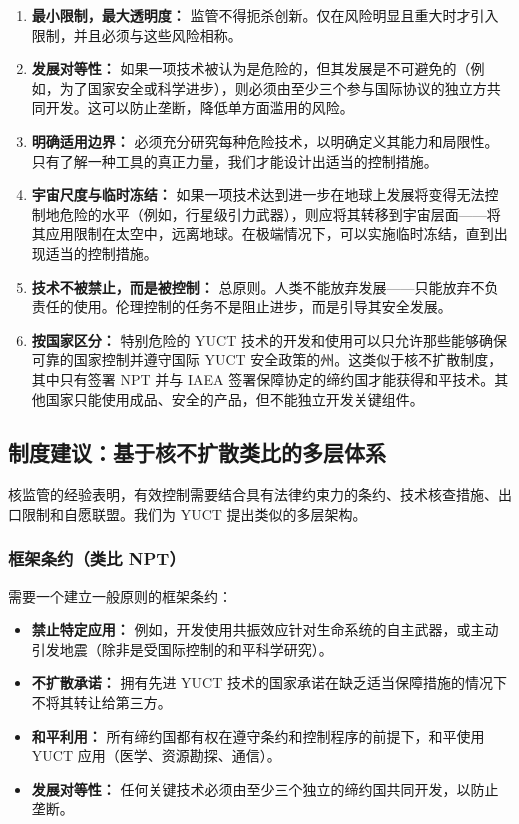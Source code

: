 \documentclass[12pt,a4paper]{article}
\theoremstyle{remark}
\begin{document}
	\begin{enumerate}[leftmargin=*]
		\item \textbf{最小限制，最大透明度：} 监管不得扼杀创新。仅在风险明显且重大时才引入限制，并且必须与这些风险相称。
		
		\item \textbf{发展对等性：} 如果一项技术被认为是危险的，但其发展是不可避免的（例如，为了国家安全或科学进步），则必须由至少三个参与国际协议的独立方共同开发。这可以防止垄断，降低单方面滥用的风险。
		
		\item \textbf{明确适用边界：} 必须充分研究每种危险技术，以明确定义其能力和局限性。只有了解一种工具的真正力量，我们才能设计出适当的控制措施。
		
		\item \textbf{宇宙尺度与临时冻结：} 如果一项技术达到进一步在地球上发展将变得无法控制地危险的水平（例如，行星级引力武器），则应将其转移到宇宙层面——将其应用限制在太空中，远离地球。在极端情况下，可以实施临时冻结，直到出现适当的控制措施。
		
		\item \textbf{技术不被禁止，而是被控制：} 总原则。人类不能放弃发展——只能放弃不负责任的使用。伦理控制的任务不是阻止进步，而是引导其安全发展。
		
		\item \textbf{按国家区分：} 特别危险的 YUCT 技术的开发和使用可以只允许那些能够确保可靠的国家控制并遵守国际 YUCT 安全政策的州。这类似于核不扩散制度，其中只有签署 NPT 并与 IAEA 签署保障协定的缔约国才能获得和平技术。其他国家只能使用成品、安全的产品，但不能独立开发关键组件。
	\end{enumerate}
	
	\subsection{制度建议：基于核不扩散类比的多层体系}
	\label{subsec:institutions}
	
	核监管的经验表明，有效控制需要结合具有法律约束力的条约、技术核查措施、出口限制和自愿联盟。我们为 YUCT 提出类似的多层架构。
	
	\subsubsection{框架条约（类比 NPT）}
	
	需要一个建立一般原则的框架条约：
	\begin{itemize}
		\item \textbf{禁止特定应用：} 例如，开发使用共振效应针对生命系统的自主武器，或主动引发地震（除非是受国际控制的和平科学研究）。
		\item \textbf{不扩散承诺：} 拥有先进 YUCT 技术的国家承诺在缺乏适当保障措施的情况下不将其转让给第三方。
		\item \textbf{和平利用：} 所有缔约国都有权在遵守条约和控制程序的前提下，和平使用 YUCT 应用（医学、资源勘探、通信）。
		\item \textbf{发展对等性：} 任何关键技术必须由至少三个独立的缔约国共同开发，以防止垄断。
	\end{itemize}
	
\end{document}
